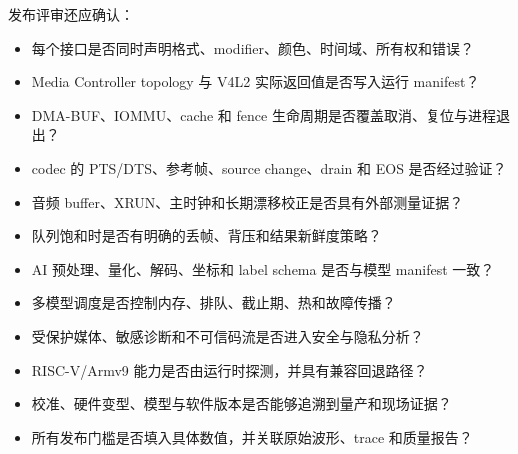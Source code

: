 发布评审还应确认：

\begin{itemize}
  \item 每个接口是否同时声明格式、modifier、颜色、时间域、所有权和错误？
  \item Media Controller topology 与 V4L2 实际返回值是否写入运行 manifest？
  \item DMA-BUF、IOMMU、cache 和 fence 生命周期是否覆盖取消、复位与进程退出？
  \item codec 的 PTS/DTS、参考帧、source change、drain 和 EOS 是否经过验证？
  \item 音频 buffer、XRUN、主时钟和长期漂移校正是否具有外部测量证据？
  \item 队列饱和时是否有明确的丢帧、背压和结果新鲜度策略？
  \item AI 预处理、量化、解码、坐标和 label schema 是否与模型 manifest 一致？
  \item 多模型调度是否控制内存、排队、截止期、热和故障传播？
  \item 受保护媒体、敏感诊断和不可信码流是否进入安全与隐私分析？
  \item RISC-V/Armv9 能力是否由运行时探测，并具有兼容回退路径？
  \item 校准、硬件变型、模型与软件版本是否能够追溯到量产和现场证据？
  \item 所有发布门槛是否填入具体数值，并关联原始波形、trace 和质量报告？
\end{itemize}
